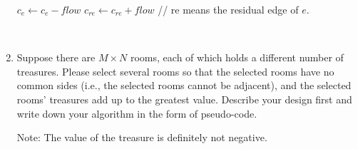 \documentclass{article}
\begin{document}
\begin{enumerate}
\begin{minipage}[htb]{0.9\textwidth}
\begin{algorithm}[H]
\begin{algorithmic}[1]
        \State $c_e \leftarrow c_e - flow$
        \State $c_{re} \leftarrow c_{re} + flow$ // re means the residual edge of $e$. 
    \EndFor
    \State {}
\EndFunction
\end{algorithmic}
\end{algorithm}
\end{minipage}
~\\
\item Suppose there are $M \times N$ rooms, each of which holds a different number of treasures. Please select several rooms so that the selected rooms have no common sides (i.e., the selected rooms cannot be adjacent), and the selected rooms' treasures add up to the greatest value.
Describe your design first and write down your algorithm in the form of pseudo-code.

Note: The value of the treasure is definitely not negative.



\end{enumerate}
\end{document}
